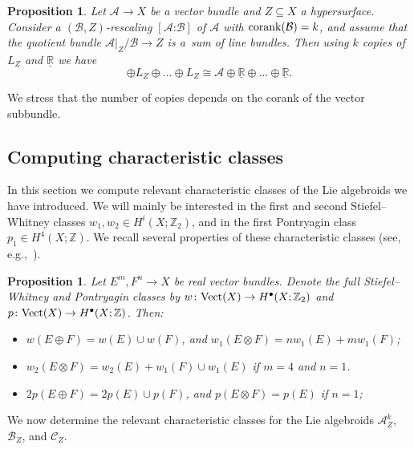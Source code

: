 \documentclass[pdftex]{sigma}
\numberwithin{equation}{section}
\newtheorem{Proposition}[Theorem]{Proposition}
 { \theoremstyle{definition}
\newtheorem{Definition}[Theorem]{Definition}
\newtheorem{Example}[Theorem]{Example}
\newtheorem{Remark}[Theorem]{Remark} }
\begin{document}
\begin{Proposition}\label{prop:logbundleiso} Let $\mathcal{A} \to X$ be a vector bundle and $Z \subseteq X$ a hypersurface. Consider a $(\mathcal{B},Z)$-rescaling $[\mathcal{A}\text{:}\mathcal{B}]$ of $\mathcal{A}$ with ${\rm corank}(\mathcal{B}) = k$, and assume that the quotient bundle $\mathcal{A}|_Z/\mathcal{B} \to Z$ is a~sum of line bundles. Then using $k$ copies of $L_Z$ and $\underline{\mathbb{R}}$ we have
	\begin{displaymath}
	[\mathcal{A}\text{:}\mathcal{B}] \oplus L_Z \oplus \dots \oplus L_Z \cong \mathcal{A} \oplus \underline{\mathbb{R}} \oplus \dots \oplus \underline{\mathbb{R}}.
	\end{displaymath}
\end{Proposition}

We stress that the number of copies depends on the corank of the vector subbundle.

\subsection{Computing characteristic classes}\label{sec:compcharclasses}

In this section we compute relevant characteristic classes of the Lie algebroids we have introduced. We will mainly be interested in the first and second Stiefel--Whitney classes $w_1, w_2 \in H^{i}(X;\mathbb{Z}_2)$, and in the first Pontryagin class $p_1 \in H^4(X;\mathbb{Z})$. We recall several properties of these characteristic classes (see, e.g.,~\cite{MilnorStasheff74}).
\begin{Proposition}\label{prop:charclasses} Let $E^m, F^n \to X$ be real vector bundles. Denote the full Stiefel--Whitney and Pontryagin classes by $w\colon {\rm Vect}(X) \to H^\bullet(X;\mathbb{Z}_2)$ and $p\colon {\rm Vect}(X) \to H^\bullet(X;\mathbb{Z})$. Then:
	\begin{itemize}\itemsep=0pt
	\item[$i)$] $w(E \oplus F) = w(E) \cup w(F)$, and $w_1(E \otimes F) = n w_1(E) + m w_1(F)$;
	\item[$ii)$] $w_2(E \otimes F) = w_2(E) + w_1(F) \cup w_1(E)$ if $m = 4$ and $n = 1$.
	\item[$iii)$] $2 p(E \oplus F) = 2 p(E) \cup p(F)$, and $p(E \otimes F) = p(E)$ if $n = 1$;
	\end{itemize}
\end{Proposition}

We now determine the relevant characteristic classes for the Lie algebroids $\mathcal{A}_Z^k$, $\mathcal{B}_Z$, and $\mathcal{C}_Z$.
\end{document}
